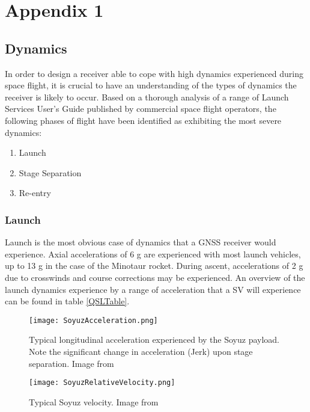 \chapter*{Appendix 1}\label{app1}

\section{Dynamics}
In order to design a receiver able to cope with high dynamics experienced during space flight, it is crucial to have an understanding of the types of dynamics the receiver is likely to occur. Based on a thorough analysis of a range of Launch Services User's Guide published by commercial space flight operators, the following phases of flight have been identified as exhibiting the most severe dynamics: 

\begin{enumerate}
\item{Launch}
\item{Stage Separation}
\item{Re-entry}
\end{enumerate}

\subsection{Launch}
Launch is the most obvious case of dynamics that a \ac{GNSS} receiver would experience. Axial accelerations of 6 g are experienced with most launch vehicles, up to 13 g in the case of the Minotaur rocket. During ascent, accelerations of 2 g due to crosswinds and course corrections may be experienced. An overview of the launch dynamics experience by a range of acceleration that a \ac{SV} will experience can be found in table \ref{QSLTable}.

\begin{figure}[!htb] 
    \centering
    \texttt{[image: SoyuzAcceleration.png]} 
    \caption{Typical longitudinal acceleration experienced by the Soyuz payload. Note the significant change in acceleration (Jerk) upon stage separation. Image from \cite{Soyuz}}
    \label{fig:SoyuzAcceleration}
\end{figure}

\begin{figure}[!htb] 
    \centering
    \texttt{[image: SoyuzRelativeVelocity.png]} 
    \caption{Typical Soyuz velocity. Image from \cite{Soyuz}}
    \label{fig:SoyuzRelativeVelocity}
\end{figure}


